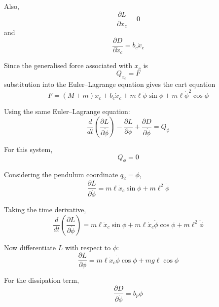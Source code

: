 \documentclass[11pt,a4paper]{article}
\begin{document}
Also,
\begin{equation*}
	\frac{\partial L}{\partial x_{c}} = 0
\end{equation*}
and
\begin{equation*}
	\frac{\partial D}{\partial \dot{x}_{c}} = b_{c} \dot{x}_{c}
\end{equation*}

Since the generalised force associated with $x_{c}$ is
\begin{equation*}
	Q_{x_{c}} = F
\end{equation*}
substitution into the Euler--Lagrange equation gives the cart equation
\begin{equation*}
	\boxed{\;
		F = \left( M + m \right) \ddot{x}_{c}
		+ b_{c} \dot{x}_{c}
		+ m \ell \ddot{\phi} \sin\phi
		+ m \ell \dot{\phi}^{2} \cos\phi
		\;} \tag{1a}
\end{equation*}

Using the same Euler--Lagrange equation:
\begin{equation*}
	\frac{d}{dt} \left( \frac{\partial L}{\partial \dot{\phi}} \right)
	- \frac{\partial L}{\partial \phi}
	+ \frac{\partial D}{\partial \dot{\phi}} = Q_{\phi}
\end{equation*}

For this system,
\begin{equation*}
	Q_{\phi} = 0
\end{equation*}

Considering the pendulum coordinate $q_{2} = \phi$,
\begin{equation*}
	\frac{\partial L}{\partial \dot{\phi}}
	= m \ell \dot{x}_{c} \sin\phi + m \ell^{2} \dot{\phi}
\end{equation*}

Taking the time derivative,
\begin{equation*}
	\frac{d}{dt} \left( \frac{\partial L}{\partial \dot{\phi}} \right)
	= m \ell \ddot{x}_{c} \sin\phi
	+ m \ell \dot{x}_{c} \dot{\phi} \cos\phi
	+ m \ell^{2} \ddot{\phi}
\end{equation*}

Now differentiate $L$ with respect to $\phi$:
\begin{equation*}
	\frac{\partial L}{\partial \phi}
	= m \ell \dot{x}_{c} \dot{\phi} \cos\phi + m g \ell \cos\phi
\end{equation*}

For the dissipation term,
\begin{equation*}
	\frac{\partial D}{\partial \dot{\phi}} = b_{p} \dot{\phi}
\end{equation*}
\end{document}
